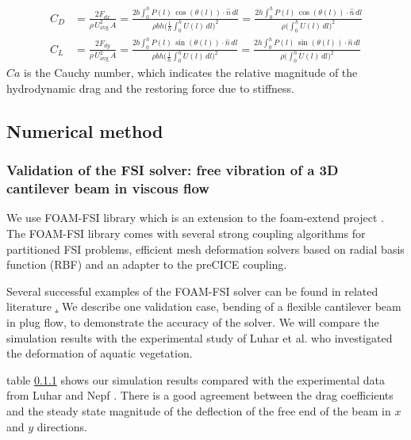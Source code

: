 \documentclass[preprint, letterpaper, nobibnotes, aps, superscriptaddress,prb]{revtex4-1}
\newcommand{\ffrac}[2]{\ensuremath{\frac{\displaystyle #1}{\displaystyle #2}}}
\begin{document}
\begin{align}
C_D &= \ffrac{2F_{{dx}}}{\rho\,U^2_{\mathrm{avg}}\,A} = \ffrac{2b\int_{0}^{h}P(l)\,\cos(\theta(l))\cdot\hat{n}\,dl}{\rho bh\bigg(\frac{1}{h}\int_{0}^{h}U(l)\,dl\bigg)^2 } = \ffrac{2h \int_{0}^{h}P(l)\,\cos(\theta(l))\cdot\hat{n}\,dl}{\rho \bigg(\int_{0}^{h}U(l)\,dl\bigg)^2}\\
C_L &= \ffrac{2F_{{dy}}}{\rho\,U^2_{\mathrm{avg}}\,A} = \ffrac{2b\int_{0}^{h}P(l)\,\sin(\theta(l))\cdot\hat{n}\,dl}{\rho bh\bigg(\frac{1}{h}\int_{0}^{h}U(l)\,dl\bigg)^2 } = \ffrac{2h \int_{0}^{h}P(l)\,\sin(\theta(l))\cdot\hat{n}\,dl}{\rho \bigg(\int_{0}^{h}U(l)\,dl\bigg)^2}
\end{align}
$Ca$ is the Cauchy number, which indicates the relative magnitude of the hydrodynamic drag and the restoring force due to stiffness.
\subsection{Numerical method}

\subsubsection{Validation of the FSI solver: free vibration of a 3D cantilever beam in viscous flow}

We use FOAM-FSI library \cite{} which is an extension to the foam-extend project \cite{}. The FOAM-FSI library comes with several strong coupling algorithms for partitioned FSI problems, efficient mesh deformation solvers based on radial basis function (RBF) and an adapter to the preCICE coupling.

Several successful examples of the FOAM-FSI solver can be found in related literature \href{Cardiff18, Lin17}. We describe one validation case, bending of a flexible cantilever beam in plug flow, to demonstrate the accuracy of the solver. We will compare the simulation results with the experimental study of Luhar et al. who investigated the deformation of aquatic vegetation.

table \ref{} shows our simulation results compared with the experimental data from Luhar and Nepf \cite{}. There is  a good agreement between the drag coefficients and the steady state magnitude of the deflection of the free end of the beam in $x$ and $y$ directions. 
\end{document}
